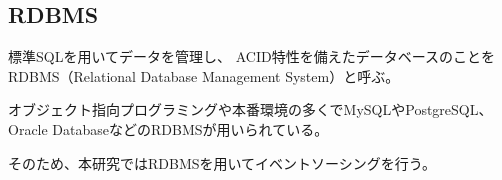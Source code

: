 \documentclass[../../../main]{subfiles}
\begin{document}
    \subsection{RDBMS}\label{subsec:phraseology-rdbms}

    標準SQLを用いてデータを管理し、 ACID特性を備えたデータベースのことをRDBMS（Relational Database Management System）と呼ぶ。

    オブジェクト指向プログラミングや本番環境の多くでMySQLやPostgreSQL、Oracle DatabaseなどのRDBMSが用いられている。

    そのため、本研究ではRDBMSを用いてイベントソーシングを行う。
\end{document}

